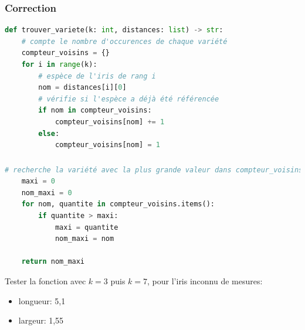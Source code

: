 \documentclass[svgnames,11pt]{beamer}
\begin{document}
\begin{frame}[fragile]
    \frametitle{Correction}
    \begin{center}
        \begin{lstlisting}[language=Python , basicstyle=\ttfamily\small, xleftmargin=0.2em, xrightmargin=-2em]
def trouver_variete(k: int, distances: list) -> str:
    # compte le nombre d'occurences de chaque variété
    compteur_voisins = {}
    for i in range(k):
        # espèce de l'iris de rang i
        nom = distances[i][0]
        # vérifie si l'espèce a déjà été référencée
        if nom in compteur_voisins:
            compteur_voisins[nom] += 1
        else:
            compteur_voisins[nom] = 1    
\end{lstlisting}
    \end{center}

\end{frame}
\begin{frame}[fragile]
    \frametitle{}

    \begin{center}
        \begin{lstlisting}[language=Python , basicstyle=\ttfamily\small, xleftmargin=0.2em, xrightmargin=-2em]
    # recherche la variété avec la plus grande valeur dans compteur_voisins
    maxi = 0
    nom_maxi = 0
    for nom, quantite in compteur_voisins.items():
        if quantite > maxi:
            maxi = quantite
            nom_maxi = nom

    return nom_maxi
\end{lstlisting}
        \label{CODE}
    \end{center}

\end{frame}
\begin{frame}

    \begin{activite}
        Tester la fonction avec $k=3$ puis $k=7$, pour l'iris inconnu de mesures:
        \begin{itemize}
            \item longueur: 5,1
            \item largeur: 1,55
        \end{itemize}
    \end{activite}

\end{frame}
\end{document}
